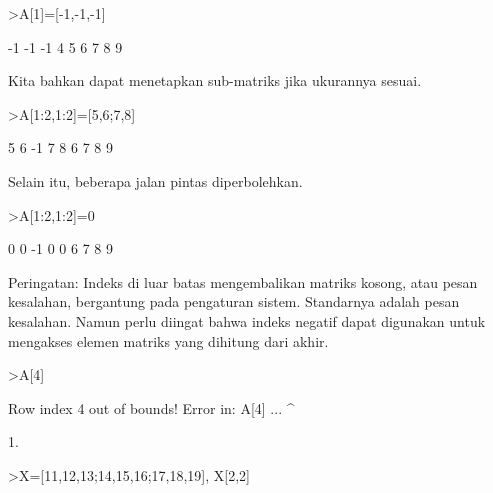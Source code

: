 \documentclass[a4paper,10pt]{article}
\begin{document}
\begin{eulernotebook}
\begin{eulercomment}
\begin{eulercomment}
\begin{eulercomment}
\begin{eulercomment}
\begin{eulercomment}
\begin{eulercomment}
\begin{eulercomment}
\begin{eulercomment}
\begin{eulercomment}
\end{eulercomment}
\begin{eulerprompt}
>A[1]=[-1,-1,-1]
\end{eulerprompt}
\begin{euleroutput}
             -1            -1            -1 
              4             5             6 
              7             8             9 
\end{euleroutput}
\begin{eulercomment}
Kita bahkan dapat menetapkan sub-matriks jika ukurannya sesuai.
\end{eulercomment}
\begin{eulerprompt}
>A[1:2,1:2]=[5,6;7,8]
\end{eulerprompt}
\begin{euleroutput}
              5             6            -1 
              7             8             6 
              7             8             9 
\end{euleroutput}
\begin{eulercomment}
Selain itu, beberapa jalan pintas diperbolehkan.
\end{eulercomment}
\begin{eulerprompt}
>A[1:2,1:2]=0
\end{eulerprompt}
\begin{euleroutput}
              0             0            -1 
              0             0             6 
              7             8             9 
\end{euleroutput}
\begin{eulercomment}
Peringatan: Indeks di luar batas mengembalikan matriks kosong, atau
pesan kesalahan, bergantung pada pengaturan sistem. Standarnya adalah
pesan kesalahan. Namun perlu diingat bahwa indeks negatif dapat
digunakan untuk mengakses elemen matriks yang dihitung dari akhir.
\end{eulercomment}
\begin{eulerprompt}
>A[4]
\end{eulerprompt}
\begin{euleroutput}
  Row index 4 out of bounds!
  Error in:
  A[4] ...
      ^
\end{euleroutput}
\begin{eulercomment}
1.
\end{eulercomment}
\begin{eulerprompt}
>X=[11,12,13;14,15,16;17,18,19], X[2,2]
\end{eulerprompt}

\end{eulercomment}
\end{eulercomment}
\end{eulercomment}
\end{eulercomment}
\end{eulercomment}
\end{eulercomment}
\end{eulercomment}
\end{eulercomment}
\end{eulernotebook}
\end{document}
